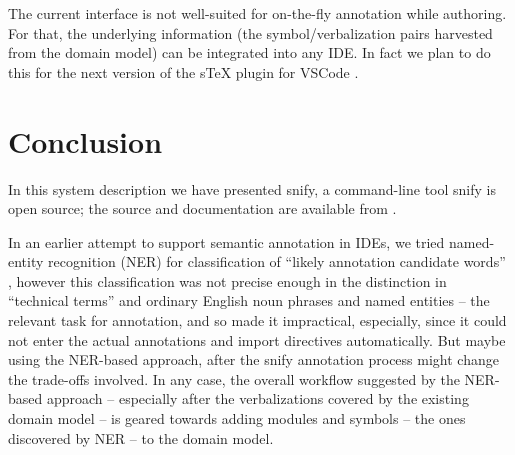 \documentclass{llncs}
\newcommand\snify{\textsf{snify}\xspace}
\begin{document}
The current interface is not well-suited for on-the-fly annotation while authoring.
For that, the underlying information (the symbol/verbalization pairs harvested
from the domain model) can be integrated into any IDE. In fact we plan to do this for the
next version of the sTeX plugin for VSCode \cite{sTeX-IDE:git}.

\section{Conclusion}

In this system description we have presented \snify, a command-line tool
 \snify is open source;
the source and documentation are available from \cite{stextools:git}.

In an earlier attempt to support semantic annotation in IDEs, we tried named-entity
recognition (NER) for classification of ``likely annotation candidate words''
\cite{hutterer:msc23}, however this classification was not precise enough in the
distinction in ``technical terms'' and ordinary English noun phrases and named entities --
the relevant task for annotation, and so made it impractical, especially, since it could
not enter the actual annotations and import directives automatically. But maybe using the
NER-based approach, after the \snify annotation process might change the trade-offs
involved. In any case, the overall workflow suggested by the NER-based approach --
especially after the verbalizations covered by the existing domain model -- is geared towards adding modules and symbols -- the ones discovered by NER
-- to the domain model. 



\printbibliography
\end{document}
